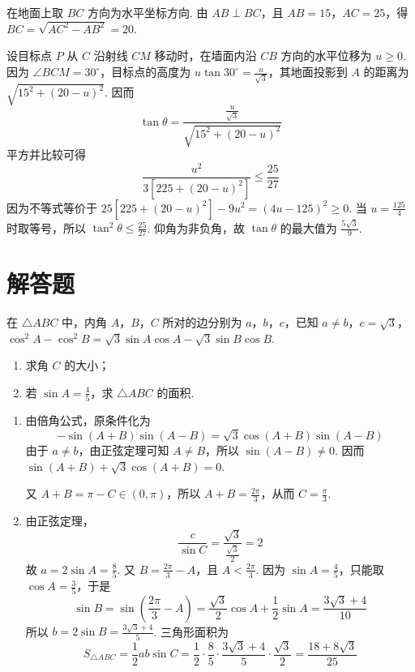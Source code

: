 \begin{solution}
在地面上取 \(BC\) 方向为水平坐标方向. 由 \(AB\perp BC\)，且 \(AB=15\)，\(AC=25\)，得 \(BC=\sqrt{AC^2-AB^2}=20\).

设目标点 \(P\) 从 \(C\) 沿射线 \(CM\) 移动时，在墙面内沿 \(CB\) 方向的水平位移为 \(u\geqslant0\). 因为 \(\angle BCM=30^\circ\)，目标点的高度为 \(u\tan30^\circ=\frac{u}{\sqrt3}\)，其地面投影到 \(A\) 的距离为 \(\sqrt{15^2+(20-u)^2}\). 因而
\[
\tan\theta=\frac{\frac{u}{\sqrt3}}{\sqrt{15^2+(20-u)^2}}
\]
平方并比较可得
\[
\frac{u^2}{3[225+(20-u)^2]}\leqslant\frac{25}{27}
\]
因为不等式等价于 \(25[225+(20-u)^2]-9u^2=(4u-125)^2\geqslant0\). 当 \(u=\frac{125}{4}\) 时取等号，所以 \(\tan^2\theta\leqslant\frac{25}{27}\). 仰角为非负角，故 \(\tan\theta\) 的最大值为 \(\frac{5\sqrt3}{9}\).
\end{solution}

\section{解答题}

\begin{problem}
在 \(\triangle ABC\) 中，内角 \(A\)，\(B\)，\(C\) 所对的边分别为 \(a\)，\(b\)，\(c\)，已知 \(a \neq b\)，\(c = \sqrt{3}\)，\(\cos^2 A - \cos^2 B = \sqrt{3} \sin A \cos A - \sqrt{3} \sin B \cos B\).

\begin{enumerate}
\item 求角 \(C\) 的大小；
\item 若 \(\sin A = \frac{4}{5}\)，求 \(\triangle ABC\) 的面积.
\end{enumerate}
\end{problem}

\begin{solution}
\begin{enumerate}
\item
由倍角公式，原条件化为
\[
-\sin(A+B)\sin(A-B)=\sqrt3\cos(A+B)\sin(A-B)
\]
由于 \(a\neq b\)，由正弦定理可知 \(A\neq B\)，所以 \(\sin(A-B)\neq0\). 因而
\(\sin(A+B)+\sqrt3\cos(A+B)=0\).

又 \(A+B=\pi-C\in(0,\pi)\)，所以 \(A+B=\frac{2\pi}{3}\)，从而 \(C=\frac\pi3\).

\item
由正弦定理，
\[
\frac{c}{\sin C}=\frac{\sqrt3}{\frac{\sqrt3}{2}}=2
\]
故 \(a=2\sin A=\frac85\). 又 \(B=\frac{2\pi}{3}-A\)，且 \(A<\frac{2\pi}{3}\). 因为 \(\sin A=\frac45\)，只能取 \(\cos A=\frac35\)，于是
\[
\sin B=\sin\left(\frac{2\pi}{3}-A\right)=\frac{\sqrt3}{2}\cos A+\frac12\sin A=\frac{3\sqrt3+4}{10}
\]
所以 \(b=2\sin B=\frac{3\sqrt3+4}{5}\). 三角形面积为
\[
S_{\triangle ABC}=\frac12ab\sin C
=\frac12\cdot\frac85\cdot\frac{3\sqrt3+4}{5}\cdot\frac{\sqrt3}{2}
=\frac{18+8\sqrt3}{25}
\]
\end{enumerate}
\end{solution}


